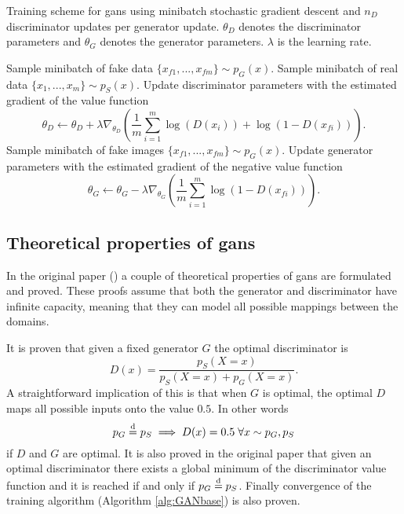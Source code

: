 \begin{algorithm}
    \caption{Training scheme for \acrlong{gans} using minibatch stochastic gradient descent and $n_D$ discriminator updates per generator update. $\theta_D$ denotes the discriminator parameters and $\theta_G$ denotes the generator parameters. $\lambda$ is the learning rate.}
    \label{alg:GANbase}
    \begin{algorithmic}[1]
        \STATE Sample minibatch of fake data $\{x_{f1}, ..., x_{fm}\} \sim p_G(x)$.
        \STATE Sample minibatch of real data $\{x_{1}, ..., x_{m}\} \sim p_S(x)$.
        \STATE Update discriminator parameters with the estimated gradient of the value function
        \begin{equation}
            \nonumber
            \theta_D \leftarrow \theta_D + \lambda \nabla_{\theta_D} \left( \frac{1}{m}\sum_{i=1}^m\log(D(x_i)) + \log(1-D(x_{fi})) \right).
        \end{equation}
        \ENDFOR
        \STATE Sample minibatch of fake images $\{x_{f1}, ..., x_{fm}\} \sim p_G(x)$.
        \STATE Update generator parameters with the estimated gradient of the negative value function
        \begin{equation}
            \nonumber
            \theta_G \leftarrow \theta_G - \lambda \nabla_{\theta_G} \left(\frac{1}{m}\sum_{i=1}^m\log(1-D(x_{fi})) \right).
        \end{equation}
        \ENDFOR
    \end{algorithmic}
\end{algorithm}


\subsection{Theoretical properties of \acrshort{gans}}
In the original paper (\textcite{goodfellow2014generative}) a couple of theoretical properties of \acrshort{gans} are formulated and proved. These proofs assume that both the generator and discriminator have infinite capacity, meaning that they can model all possible mappings between the domains.

It is proven that given a fixed generator $G$ the optimal discriminator is 
\begin{equation}
    D(x) = \frac{p_S(X=x)}{p_S(X=x) + p_G(X=x)}.
\end{equation}
A straightforward implication of this is that when $G$ is optimal, the optimal $D$ maps all possible inputs onto the value $0.5$. In other words
\begin{equation}
    p_G \stackrel{\text{d}}{=} p_S \implies D(x) = 0.5 \; \forall x \sim p_G, p_S
\end{equation}
if $D$ and $G$ are optimal. It is also proved in the original paper that given an optimal discriminator there exists a global minimum of the discriminator value function and it is reached if and only if $p_G \stackrel{\text{d}}{=} p_S$. Finally convergence of the training algorithm (Algorithm \ref{alg:GANbase}) is also proven.

